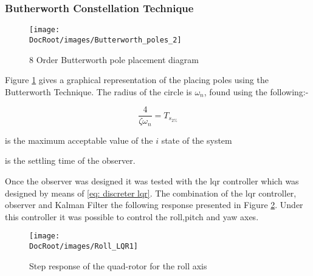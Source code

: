 \subsubsection{Butherworth Constellation Technique}

\begin{figure}[h]
	\centering
	\texttt{[image: \\DocRoot/images/Butterworth\_poles\_2]}
	\caption{8 Order Butterworth pole placement diagram }
	\label{Fig:butterworth diagram}
\end{figure}

Figure \ref{Fig:butterworth diagram} gives a graphical representation of the placing poles using the Butterworth Technique. The radius of the circle is $\omega_n$, found using the following:-

\begin{equation}
\frac{4}{\zeta \omega_n} = T_{s_{2\%}} \label{eq: observer design equation}
\end{equation}

 {	
 	\begin{description}[itemsep=1mm]
 		\item[Where:-]
 		\item[$\zeta$:] is the maximum acceptable value of the $i$ state of the system 
 		\item[$T_{s_2\%}$:] is the settling time of the observer.
 	\end{description}
 }

Once the observer was designed it was tested with the \gls{lqr} controller which was designed by means of \eqref{eq: discreter lqr}. The combination of the \gls{lqr} controller, observer and Kalman Filter the following response presented in Figure \ref{Fig:lqr controller}. Under this controller it was possible to control the roll,pitch and yaw axes.


\begin{figure}[h]
	\centering
	\texttt{[image: \\DocRoot/images/Roll\_LQR1]}
	\caption{Step response of the quad-rotor for the roll axis}
	\label{Fig:lqr controller}
\end{figure}
